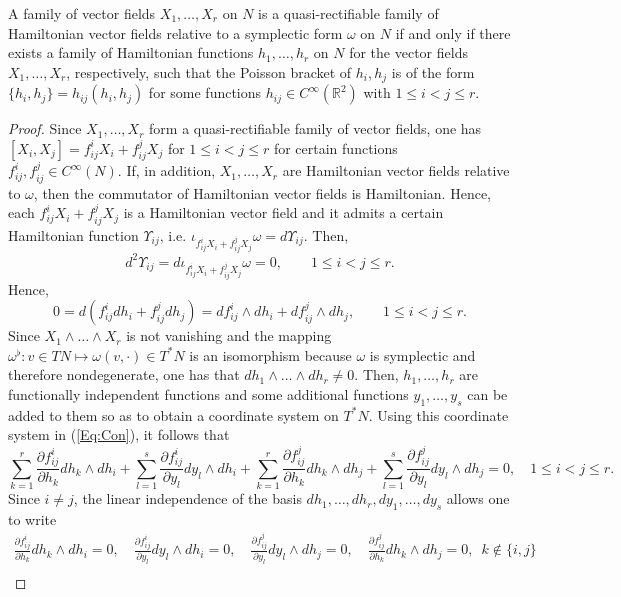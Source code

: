 \documentclass[10pt,a4paper]{amsart}
\begin{document}
\begin{theorem}\label{Th:HamRec} A family of vector fields $X_1,\ldots,X_r$ on $N$ is a quasi-rectifiable family of Hamiltonian vector fields relative to a symplectic form $\omega$ on $N$ if and only if there exists a family of Hamiltonian functions $h_1,\ldots,h_r$ on $N$ for the vector fields $X_1,\ldots,X_r$, respectively, such that the Poisson bracket of $h_i,h_j$ is of the form $\{h_i,h_j\}=h_{ij}(h_i,h_j)$ for some functions $h_{ij}\in C^\infty(\mathbb{R}^2)$ with $1\leq i<j\leq r$.
\end{theorem}

\begin{proof} Since $X_1,\ldots,X_r$ form a quasi-rectifiable family of vector fields, one has  $[X_i,X_j]=f_{ij}^iX_i+f_{ij}^jX_j$ for $1\leq i<j\leq r$ for certain functions $f_{ij}^i,f_{ij}^j\in C^\infty(N)$. If, in addition, $X_1,\ldots,X_r$ are Hamiltonian vector fields relative to $\omega$, then the commutator of Hamiltonian vector fields is Hamiltonian. Hence, each $f_{ij}^iX_i+f_{ij}^jX_j$ is a Hamiltonian vector field and it admits a certain Hamiltonian function $\Upsilon_{ij}$, i.e. $\iota_{f_{ij}^iX_i+f_{ij}^jX_j}
\omega=d\Upsilon_{ij}$. Then,
$$
d^2\Upsilon_{ij}=d\iota_{f_{ij}^iX_i+f_{ij}^jX_j}\omega=0,\qquad 1\leq i<j\leq r.
$$
Hence,
\begin{equation}\label{Eq:Con}
0=d(f_{ij}^idh_i+f_{ij}^jdh_j)=df_{ij}^i\wedge dh_i+df_{ij}^j\wedge dh_j,\qquad 1\leq i<j\leq r.
\end{equation}
Since $X_1\wedge\ldots\wedge X_r$ is not vanishing and the mapping $\omega^\flat:v\in TN\mapsto \omega(v,\cdot)\in T^*N$ is an isomorphism because $\omega$ is symplectic and therefore nondegenerate, one has that $dh_1\wedge\ldots\wedge dh_r\neq 0$. Then, $h_1,\ldots,h_r$ are functionally independent functions and some additional functions $y_1,\ldots,y_s$ can be added to them so as to obtain a coordinate system on $T^*N$. Using this coordinate system in (\ref{Eq:Con}), it follows that
$$
\sum_{k=1}^r\frac{\partial f_{ij}^i}{\partial h_k}dh_k\wedge dh_i+\sum_{l=1}^s\frac{\partial f_{ij}^i}{\partial y_l}dy_l\wedge dh_i+\sum_{k=1}^r\frac{\partial f_{ij}^j}{\partial h_k}dh_k\wedge dh_j+\sum_{l=1}^s\frac{\partial f_{ij}^j}{\partial y_l}dy_l\wedge dh_j=0,\quad 1\leq i<j\leq r.
$$
Since $i\neq j$, the linear independence of the basis $dh_1,\ldots,dh_r,dy_1,\ldots,dy_s$ allows one to write
$$
\begin{gathered}
\frac{\partial f_{ij}^i}{\partial h_k}dh_k\wedge dh_i=0,\quad \frac{\partial f_{ij}^i}{\partial y_l}dy_l\wedge dh_i=0,\quad \frac{\partial f_{ij}^j}{\partial y_l}dy_l\wedge dh_j=0,\quad \frac{\partial f_{ij}^j}{\partial h_k}dh_k\wedge dh_j=0,\,\,\,k\notin \{i,j\}\\

\end{gathered}$$
\end{proof}
\end{document}
